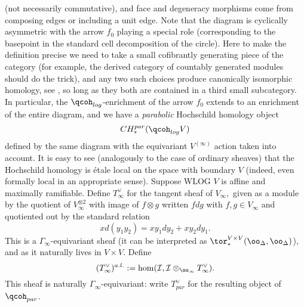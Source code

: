 \documentclass{article}
\newcommand{\I}{\mathcal{I}}
\begin{document}
(not necessarily commutative), and face and degeneracy morphisms come from composing edges or including a unit edge. Note that the diagram is cyclically asymmetric with the arrow $f_0$ playing a special role (corresponding to the basepoint in the standard cell decomposition of the circle). Here to make the definition precise we need to take a small cofibrantly generating piece of the category (for example, the derived category of countably generated modules should do the trick), and any two such choices produce canonically isomorphic homology, see \cite{blumberg-mandell}, so long as they both are contained in a third small subcategory. In particular, the $\qcoh_{log}$-enrichment of the arrow $f_0$ extends to an enrichment of the entire diagram, and we have a \emph{parabolic} Hochschild homology object $$CH_*^{par}(\qcoh_{log}V)$$ defined by the same diagram with the equivariant $V^{(\infty)}$ action taken into account. It is easy to see (analogously to the case of ordinary sheaves) that the Hochschild homology is \'etale local on the space with boundary $V$ (indeed, even formally local in an appropriate sense). Suppose WLOG $V$ is affine and maximally ramifiable. Define $T_\infty^\vee$ for the tangent sheaf of $V_\infty,$ given as a module by the quotient of $V_\infty^{\otimes 2}$ with image of $f\otimes g$ written $f dg$ with $f, g\in V_\infty$ and quotiented out by the standard relation $$x d(y_1 y_2) = xy_1 d y_2 + xy_2 dy_1.$$ This is a $\Gamma_\infty$-equivariant sheaf (it can be interpreted as $\tor_*^{V\times V}(\oo_\Delta, \oo_\Delta)$), and as it naturally lives in $V\times V$. Define $$(T_\infty^\vee)^{a.l.} : = \hom(\I, \I\otimes_{\oo_\infty}T_\infty^\vee).$$ This sheaf is naturally $\Gamma_\infty$-equivariant: write $T^\vee_{par}$ for the resulting object of $\qcoh_{par}$.
\end{document}
